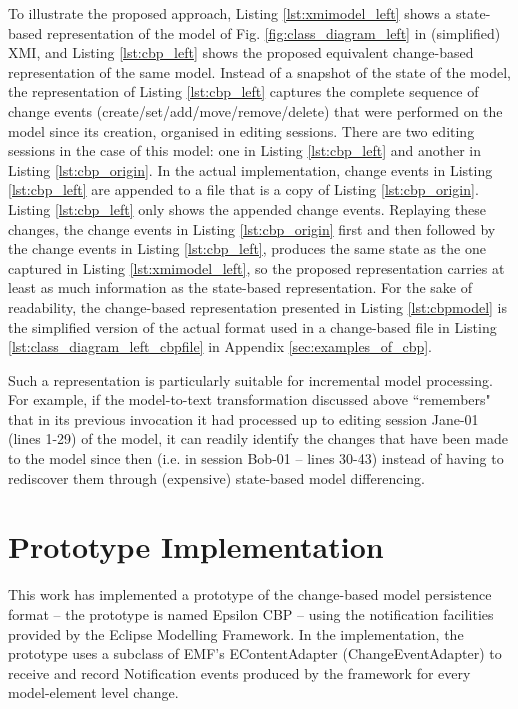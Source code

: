 To illustrate the proposed approach, Listing \ref{lst:xmimodel_left} shows a state-based representation of the model of Fig. \ref{fig:class_diagram_left} in (simplified) XMI, and Listing \ref{lst:cbp_left} shows the proposed equivalent change-based representation of the same model. Instead of a snapshot of the state of the model, the representation of Listing \ref{lst:cbp_left} captures the complete sequence of change events (create/set/add/move/remove/delete) that were performed on the model since its creation, organised in editing sessions. There are two editing sessions in the case of this model: one in Listing \ref{lst:cbp_left} and another in Listing \ref{lst:cbp_origin}. In the actual implementation, change events in Listing \ref{lst:cbp_left} are appended to a file that is a copy of Listing \ref{lst:cbp_origin}. Listing \ref{lst:cbp_left} only shows the appended change events. Replaying these changes, the change events in Listing \ref{lst:cbp_origin} first and then followed by the change events in Listing \ref{lst:cbp_left}, produces the same state as the one captured in Listing \ref{lst:xmimodel_left}, so the proposed representation carries at least as much information as the state-based representation. For the sake of readability, the change-based representation presented in Listing \ref{lst:cbpmodel} is the simplified version of the actual format used in a  change-based file in Listing \ref{lst:class_diagram_left_cbpfile} in Appendix \ref{sec:examples_of_cbp}. 

Such a representation is particularly suitable for incremental model processing. For example, if the model-to-text transformation discussed above ``remembers" that in its previous invocation it had processed up to editing session \textsf{Jane-01} (lines 1-29) of the model, it can readily identify the changes that have been made to the model since then (i.e. in session \textsf{Bob-01} -- lines 30-43) instead of having to rediscover them through (expensive) state-based model differencing.

\section{Prototype Implementation}
\label{sec:prototype_implementation}
This work has implemented a prototype \cite{epsilonlabs2019emfcbp} of the change-based model persistence format -- the prototype is named Epsilon CBP -- using the notification facilities provided by the Eclipse Modelling Framework. In the implementation, the prototype uses a subclass of EMF's \textsf{EContentAdapter} (\textsf{ChangeEventAdapter}) to receive and record \textsf{Notification} events produced by the framework for every model-element level change.

